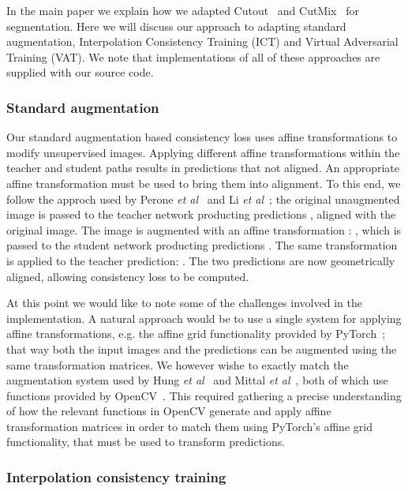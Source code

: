 \documentclass{bmvc2k}
\def\etal{\emph{et al}\bmvaOneDot}
\begin{document}
In the main paper we explain how we adapted Cutout~\cite{Devries:Cutout} and CutMix~\cite{Yun:CutMix} for segmentation.
Here we will discuss our approach to adapting standard augmentation, Interpolation Consistency Training (ICT) and Virtual Adversarial Training (VAT).
We note that implementations of all of these approaches are supplied with our source code.

\subsubsection{Standard augmentation}

Our standard augmentation based consistency loss uses affine transformations to modify unsupervised images.
Applying different affine transformations within the teacher and student paths results in predictions that not aligned.
An appropriate affine transformation must be used to bring them into alignment.
To this end, we follow the approch used by Perone \etal~\cite{Perone:SemiSupSeg} and Li \etal~\cite{Li:SemiSupSkin};
the original unaugmented image  is passed to the teacher network  producting predictions , aligned with
the original image. The image is augmented with an affine transformation : , which is passed to the student network 
producting predictions . The same transformation is applied to the teacher prediction: . The two predictions are
now geometrically aligned, allowing consistency loss to be computed.

At this point we would like to note some of the challenges involved in the implementation.
A natural approach would be to use a single system for applying affine transformations, e.g. the affine grid functionality provided by PyTorch~\cite{PyTorch};
that way both the input images and the predictions can be augmented using the same transformation matrices.
We however wishe to exactly match the augmentation system used by Hung \etal~\cite{Hung:AdvSemiSupSeg} and Mittal \etal~\cite{Mittal:SSSHiLow}, both
of which use functions provided by OpenCV~\cite{OpenCV}. This required gathering a precise understanding of how the relevant functions in
OpenCV generate and apply affine transformation matrices in order to match them using PyTorch's affine grid functionality, that must be used to
transform predictions.


\subsubsection{Interpolation consistency training}
\end{document}
